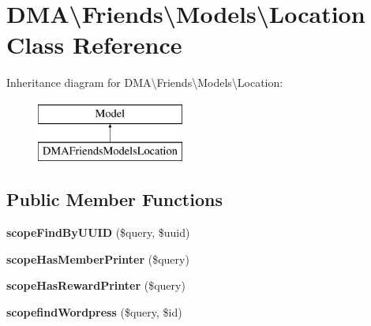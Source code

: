 \hypertarget{classDMA_1_1Friends_1_1Models_1_1Location}{}\section{D\+M\+A\textbackslash{}Friends\textbackslash{}Models\textbackslash{}Location Class Reference}
\label{classDMA_1_1Friends_1_1Models_1_1Location}
Inheritance diagram for D\+M\+A\textbackslash{}Friends\textbackslash{}Models\textbackslash{}Location\+:\begin{figure}[H]
\begin{center}
\leavevmode
\includegraphics[height=2.000000cm]{d6/df9/classDMA_1_1Friends_1_1Models_1_1Location}
\end{center}
\end{figure}
\subsection*{Public Member Functions}
\begin{DoxyCompactItemize}
\item 
\hypertarget{classDMA_1_1Friends_1_1Models_1_1Location_a9497c29c40152b277d6cfcafce691f25}{}{\bfseries scope\+Find\+By\+U\+U\+I\+D} (\$query, \$uuid)\label{classDMA_1_1Friends_1_1Models_1_1Location_a9497c29c40152b277d6cfcafce691f25}

\item 
\hypertarget{classDMA_1_1Friends_1_1Models_1_1Location_a44e45661138474dbe8a215ba477a8237}{}{\bfseries scope\+Has\+Member\+Printer} (\$query)\label{classDMA_1_1Friends_1_1Models_1_1Location_a44e45661138474dbe8a215ba477a8237}

\item 
\hypertarget{classDMA_1_1Friends_1_1Models_1_1Location_a4f3819ea49bbdfbd3309a926fbb04d95}{}{\bfseries scope\+Has\+Reward\+Printer} (\$query)\label{classDMA_1_1Friends_1_1Models_1_1Location_a4f3819ea49bbdfbd3309a926fbb04d95}

\item 
\hypertarget{classDMA_1_1Friends_1_1Models_1_1Location_ad8b1171d787276f812889f20a6916e15}{}{\bfseries scopefind\+Wordpress} (\$query, \$id)\label{classDMA_1_1Friends_1_1Models_1_1Location_ad8b1171d787276f812889f20a6916e15}

\end{DoxyCompactItemize}
